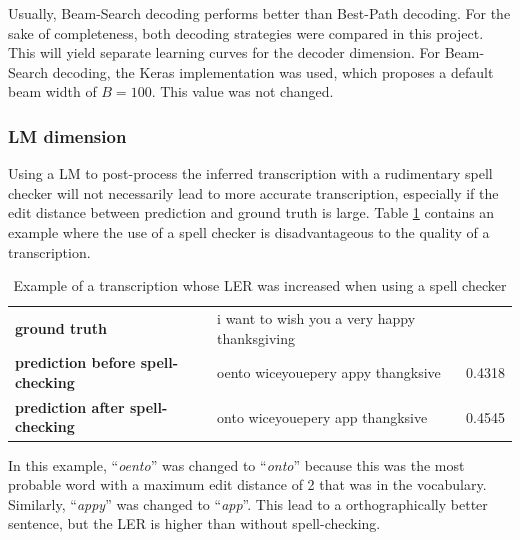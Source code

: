 Usually, Beam-Search decoding performs better than Best-Path decoding. For the sake of completeness, both decoding strategies were compared in this project. This will yield separate learning curves for the decoder dimension. For Beam-Search decoding, the Keras implementation was used, which proposes a default beam width of $B=100$. This value was not changed. 

\subsubsection{\ac{LM} dimension}

Using a \ac{LM} to post-process the inferred transcription with a rudimentary spell checker will not necessarily lead to more accurate transcription, especially if the edit distance between prediction and ground truth is large. Table \ref{lm_bad_example} contains an example where the use of a spell checker is disadvantageous to the quality of a transcription.

\begin{table}[!htbp]
	\centering
	\begin{tabular}{|l|l|r|}
		\hline
		 &  & \thead{\ac{LER}} \\
		\hline
		\textbf{ground truth} & i want to wish you a very happy thanksgiving & \\ 
		\hline
		\textbf{prediction before spell-checking} & oento wiceyouepery appy thangksive & 0.4318 \\ 
		\hline		
		\textbf{prediction after spell-checking} & onto wiceyouepery app thangksive & 0.4545 \\ 		
		\hline		
	\end{tabular}
	\caption{Example of a transcription whose \ac{LER} was increased when using a spell checker}
	\label{lm_bad_example}
\end{table}



In this example, \foreignquote{french}{\textit{oento}} was changed to \foreignquote{french}{\textit{onto}} because this was the most probable word with a maximum edit distance of 2 that was in the vocabulary. Similarly, \foreignquote{french}{\textit{appy}} was changed to \foreignquote{french}{\textit{app}}. This lead to a orthographically better sentence, but the \ac{LER} is higher than without spell-checking. 


